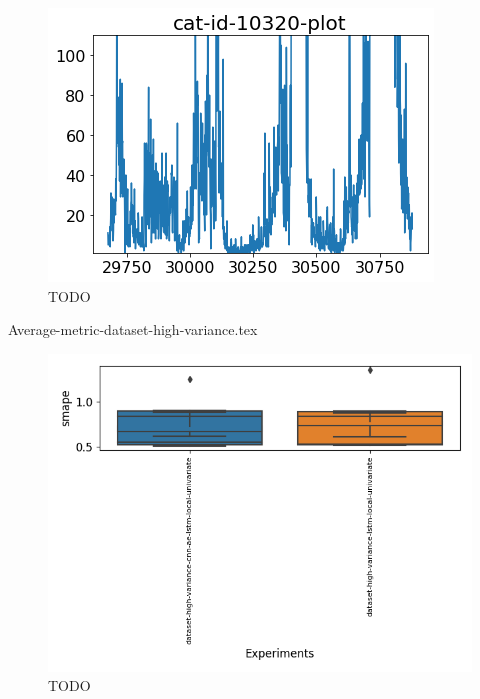 \begin{figure}[h!]
  \centering
  \includegraphics[width=\textwidth]{./figs/code_generated/data_exploration/cat-id-10320-plot.png}
  \hfill
  \caption{TODO}
  \label{fig:cat-id-10320-cnn-ae-beat-lstm}
\end{figure}

{Average-metric-dataset-high-variance.tex}

\begin{figure}[h!]
  \centering
  \includegraphics[width=\textwidth]{./figs/results/boxplot/smape-dataset_high_variance.png}
  \hfill
  \caption{TODO}
  \label{fig:results-smape-dataset-high-variance}
\end{figure}
\fi
